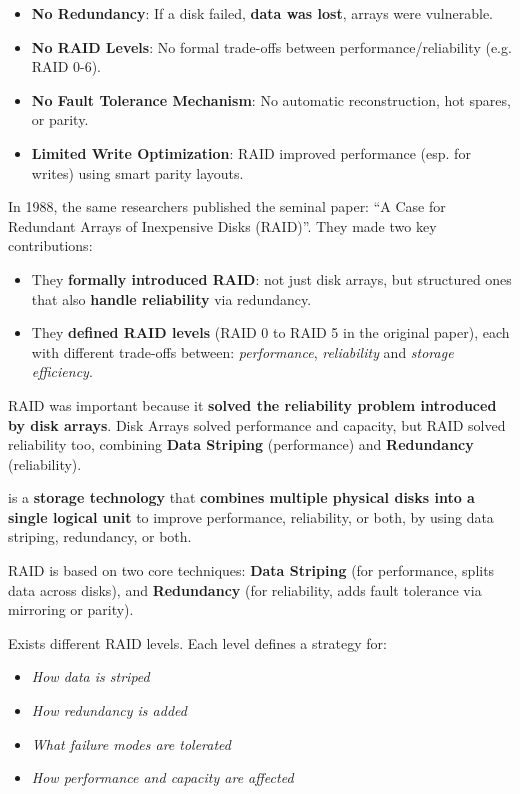 \begin{itemize}
\begin{itemize}[label=\textcolor{Red2}{}]
        \item \textcolor{Red2}{\textbf{No Redundancy}}: If a disk failed, \textbf{data was lost}, arrays were vulnerable.
        \item \textcolor{Red2}{\textbf{No RAID Levels}}: No formal trade-offs between performance/reliability (e.g. RAID 0-6).
        \item \textcolor{Red2}{\textbf{No Fault Tolerance Mechanism}}: No automatic reconstruction, hot spares, or parity.
        \item \textcolor{Red2}{\textbf{Limited Write Optimization}}: RAID improved performance (esp. for writes) using smart parity layouts.
    \end{itemize}
\end{itemize}

\highspace
In 1988, the same researchers published the seminal paper: ``A Case for Redundant Arrays of Inexpensive Disks (RAID)''\cite{Patterson:CSD-87-391}. They made two key contributions:
\begin{itemize}
    \item They \textbf{formally introduced RAID}: not just disk arrays, but structured ones that also \textbf{handle reliability} via redundancy.
    \item They \textbf{defined RAID levels} (RAID 0 to RAID 5 in the original paper), each with different trade-offs between: \emph{performance}, \emph{reliability} and \emph{storage efficiency}.
\end{itemize}
RAID was important because it \textbf{solved the reliability problem introduced by disk arrays}. Disk Arrays solved performance and capacity, but RAID solved reliability too, combining \textbf{Data Striping} (performance) and \textbf{Redundancy} (reliability).

\begin{definitionbox}[: RAID]
     is a \textbf{storage technology} that \textbf{combines multiple physical disks into a single logical unit} to improve performance, reliability, or both, by using data striping, redundancy, or both.

    \highspace
    RAID is based on two core techniques: \textbf{Data Striping} (for performance, splits data across disks), and \textbf{Redundancy} (for reliability, adds fault tolerance via mirroring or parity).

    \highspace
    Exists different RAID levels. Each level defines a strategy for:
    \begin{itemize}
        \item \emph{How data is striped}
        \item \emph{How redundancy is added}
        \item \emph{What failure modes are tolerated}
        \item \emph{How performance and capacity are affected}
    \end{itemize}
\end{definitionbox}

